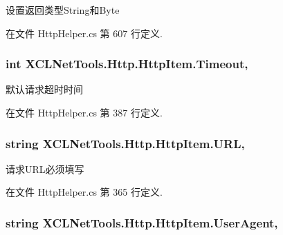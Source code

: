 设置返回类型\-String和\-Byte 



在文件 Http\-Helper.\-cs 第 607 行定义.

\hypertarget{class_x_c_l_net_tools_1_1_http_1_1_http_item_a916fc3ebf5e0a663cd007e016cb9628a}{
\subsubsection[{Timeout}]{\setlength{\rightskip}{0pt plus 5cm}int X\-C\-L\-Net\-Tools.\-Http.\-Http\-Item.\-Timeout\hspace{0.3cm}{\ttfamily [get]}, {\ttfamily [set]}}}\label{class_x_c_l_net_tools_1_1_http_1_1_http_item_a916fc3ebf5e0a663cd007e016cb9628a}


默认请求超时时间 



在文件 Http\-Helper.\-cs 第 387 行定义.

\hypertarget{class_x_c_l_net_tools_1_1_http_1_1_http_item_a7936af55970113dd94765443dadd47f7}{
\subsubsection[{U\-R\-L}]{\setlength{\rightskip}{0pt plus 5cm}string X\-C\-L\-Net\-Tools.\-Http.\-Http\-Item.\-U\-R\-L\hspace{0.3cm}{\ttfamily [get]}, {\ttfamily [set]}}}\label{class_x_c_l_net_tools_1_1_http_1_1_http_item_a7936af55970113dd94765443dadd47f7}


请求\-U\-R\-L必须填写 



在文件 Http\-Helper.\-cs 第 365 行定义.

\hypertarget{class_x_c_l_net_tools_1_1_http_1_1_http_item_a25ea4f4ea5d663ecb0d235eaf5d63469}{
\subsubsection[{User\-Agent}]{\setlength{\rightskip}{0pt plus 5cm}string X\-C\-L\-Net\-Tools.\-Http.\-Http\-Item.\-User\-Agent\hspace{0.3cm}{\ttfamily [get]}, {\ttfamily [set]}}}\label{class_x_c_l_net_tools_1_1_http_1_1_http_item_a25ea4f4ea5d663ecb0d235eaf5d63469}


